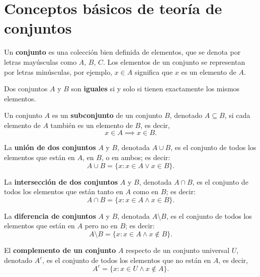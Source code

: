 \documentclass[a4,11pt]{aleph-notas}
\begin{document}
\encabezado

\section{Conceptos básicos de teoría de conjuntos}

\begin{defi}[Conjunto]
    Un \textbf{conjunto} es una colección bien definida de elementos, que se denota por letras mayúsculas como $A$, $B$, $C$. Los elementos de un conjunto se representan por letras minúsculas, por ejemplo, $x \in A$ significa que $x$ es un elemento de $A$.
\end{defi}

\begin{defi}
    Dos conjuntos $A$ y $B$ son \textbf{iguales} si y solo si tienen exactamente los mismos elementos.
\end{defi}

\begin{defi}[Subconjunto]
    Un conjunto $A$ es un \textbf{subconjunto} de un conjunto $B$, denotado $A \subseteq B$, si cada elemento de $A$ también es un elemento de $B$, es decir,
    \[
        x \in A \implies x \in B.
    \]
\end{defi}

\begin{defi}
    La \textbf{unión de dos conjuntos} $A$ y $B$, denotada $A \cup B$, es el conjunto de todos los elementos que están en $A$, en $B$, o en ambos; es decir:
    \[
        A \cup B = \{x : x \in A \lor x \in B\}.
    \]
\end{defi}

\begin{defi}
    La \textbf{intersección de dos conjuntos} $A$ y $B$, denotada $A \cap B$, es el conjunto de todos los elementos que están tanto en $A$ como en $B$; es decir:
    \[
        A \cap B = \{x : x \in A \land x \in B\}.
    \]
\end{defi}

\begin{defi}
    La \textbf{diferencia de conjuntos} $A$ y $B$, denotada $A \setminus B$, es el conjunto de todos los elementos que están en $A$ pero no en $B$; es decir:
    \[
        A \setminus B = \{x : x \in A \land x \notin B\}.
    \]
\end{defi}

\begin{defi}
    El \textbf{complemento de un conjunto} $A$ respecto de un conjunto universal $U$, denotado $A^c$, es el conjunto de todos los elementos que no están en $A$, es decir,
    \[
        A^c = \{x : x \in U \land x \notin A\}.
    \]
\end{defi}
\end{document}
